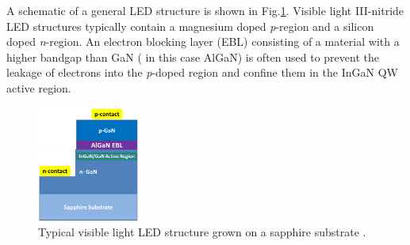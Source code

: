 A schematic of a general LED structure is shown in Fig.\ref{1.11}. Visible light III-nitride LED structures typically contain a magnesium doped {\it p}-region and a silicon doped {\it n}-region. An electron blocking layer  (EBL) consisting of a material with a higher bandgap than GaN ( in this case AlGaN) is often used to prevent the leakage of electrons into the {\it p}-doped region and confine them in the InGaN QW active region.

\begin{figure}[h]
	\centering
	\includegraphics[width=0.3\textwidth]{Figs/Ch1/led.png}
	\caption {Typical visible light LED structure grown on a sapphire substrate \cite{Ren2015}.}
	\label{1.11}
\end{figure}
\FloatBarrier 

